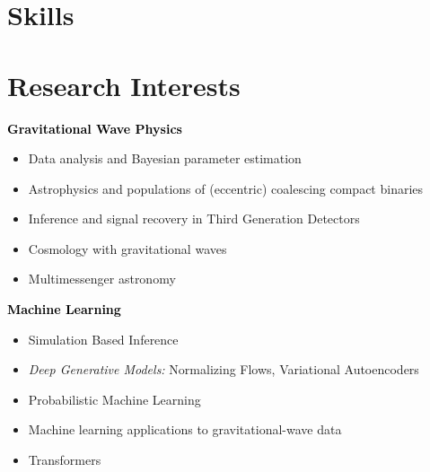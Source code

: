 \section{Skills}



\section{Research Interests}
\textbf{\textcolor{black}{Gravitational Wave Physics}}
\begin{itemize}[label=-, leftmargin=0.5cm]
    \item Data analysis and Bayesian parameter estimation
    \item Astrophysics and populations of (eccentric) coalescing compact binaries
    \item Inference and signal recovery in Third Generation Detectors
    \item Cosmology with gravitational waves
    \item Multimessenger astronomy
\end{itemize}
\medskip
\textbf{\textcolor{black}{Machine Learning}}
\begin{itemize}[label=-, leftmargin=0.5cm]
    \item Simulation Based Inference
    \item \textit{Deep Generative Models:} Normalizing Flows, Variational Autoencoders
    \item Probabilistic Machine Learning
    \item Machine learning applications to gravitational-wave data
    \item Transformers
\end{itemize}

